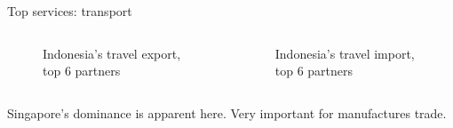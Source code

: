 \documentclass[
  ignorenonframetext,
]{beamer}
\begin{document}
\begin{frame}{Top services: transport}
\label{top-services-transport}
\begin{columns}[T]
\begin{column}{0.47\textwidth}
\begin{figure}


\caption{\label{fig-SX}Indonesia's travel export, top 6 partners}

\end{figure}%
\end{column}

\begin{column}{0.47\textwidth}
\begin{figure}


\caption{\label{fig-SM}Indonesia's travel import, top 6 partners}

\end{figure}%
\end{column}
\end{columns}

Singapore's dominance is apparent here. Very important for manufactures
trade.
\end{frame}
\end{document}
